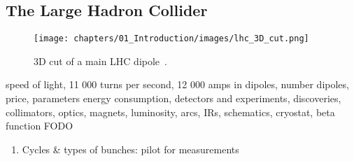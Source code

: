 \subsection{The Large Hadron Collider}

\begin{figure}[H]
    \texttt{[image: chapters/01\_Introduction/images/lhc\_3D\_cut.png]}
    \caption{3D cut of a main LHC dipole~\cite{noauthor_cern_nodate}.}
    \label{fig:3d_cut_dipole}
\end{figure}

speed of light, 11 000 turns per second, 12 000 amps in dipoles, number dipoles, price, parameters
energy consumption, detectors and experiments, discoveries, collimators, optics, magnets, luminosity, arcs, IRs, schematics, cryostat, beta function FODO

\begin{enumerate}
    \color{red}
    \item Cycles \& types of bunches: pilot for measurements
\end{enumerate}